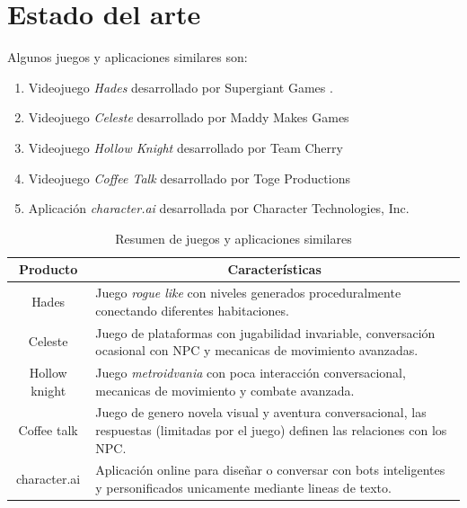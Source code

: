 \documentclass[12pt,twoside]{article}
\begin{document}
	\section{Estado del arte}%
	Algunos juegos y aplicaciones similares son:
	\begin{enumerate}[noitemsep]
		\item Videojuego \textit{Hades} desarrollado por Supergiant Games \cite{game:hades}. 

		\item Videojuego \textit{Celeste} desarrollado por Maddy Makes Games \cite{game:celeste}

		\item Videojuego \textit{Hollow Knight} desarrollado por Team Cherry \cite{game:hollow}
		
		\item Videojuego \textit{Coffee Talk} desarrollado por Toge Productions \cite{game: coffee}
		
		\item Aplicación \textit{character.ai} desarrollada por Character Technologies, Inc. \cite{app: character}
	\end{enumerate}
	
	\begin{table}[H]
		\centering
		\begin{tabular}{|c|p{9cm}|}
			\hline
			\textbf{Producto} & \multicolumn{1}{c|}{\textbf{Características}} \\ \hline
			 Hades &  Juego \textit{rogue like}  con niveles generados proceduralmente conectando diferentes habitaciones.\\ \hline
			 
			 Celeste &  Juego de plataformas con jugabilidad invariable, conversación ocasional con NPC y mecanicas de movimiento avanzadas. \\ \hline
			 
			 Hollow knight &   Juego \textit{metroidvania} con poca interacción conversacional, mecanicas de movimiento y combate avanzada. \\ \hline
			 
			 Coffee talk &   Juego de genero novela visual y aventura conversacional, las respuestas (limitadas por el juego) definen las relaciones con los NPC. \\ \hline
			 
			 character.ai&   Aplicación online para diseñar o conversar con bots inteligentes y personificados unicamente mediante lineas de texto. \\ \hline
		\end{tabular}
		\caption{Resumen de juegos y aplicaciones similares}
		\label{table: aplicaciones}
	\end{table} 
	
\end{document}
